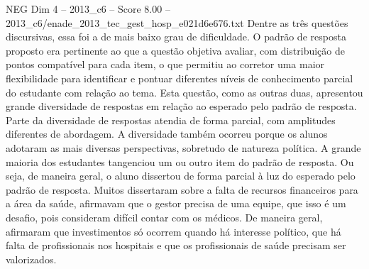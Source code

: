 \begin{textsample}{NEG Dim 4 – 2013\_c6 – Score 8.00 – 2013\_c6/enade\_2013\_tec\_gest\_hosp\_e021d6e676.txt}
Dentre as três questões discursivas, essa foi a de mais baixo grau de dificuldade.
O padrão de resposta proposto era pertinente ao que a questão objetiva avaliar, com distribuição de pontos compatível para cada item, o que permitiu ao corretor uma maior flexibilidade para identificar e pontuar diferentes níveis de conhecimento parcial do estudante com relação ao tema.
Esta questão, como as outras duas, apresentou grande diversidade de respostas em relação ao esperado pelo padrão de resposta.
Parte da diversidade de respostas atendia de forma parcial, com amplitudes diferentes de abordagem.
A diversidade também ocorreu porque os alunos adotaram as mais diversas perspectivas, sobretudo de natureza política.
A grande maioria dos estudantes tangenciou um ou outro item do padrão de resposta.
Ou seja, de maneira geral, o aluno dissertou de forma parcial à luz do esperado pelo padrão de resposta.
Muitos dissertaram sobre a falta de recursos financeiros para a área da saúde, afirmavam que o gestor precisa de uma equipe, que isso é um desafio, pois consideram difícil contar com os médicos.
De maneira geral, afirmaram que investimentos só ocorrem quando há interesse político, que há falta de profissionais nos hospitais e que os profissionais de saúde precisam ser valorizados.

\end{textsample}
